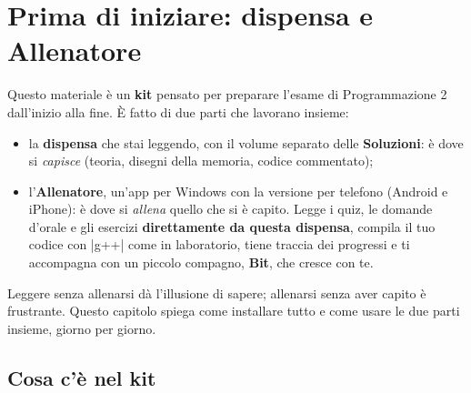 \chapter*{Prima di iniziare: dispensa e Allenatore}

Questo materiale è un \textbf{kit} pensato per preparare l'esame di Programmazione 2
dall'inizio alla fine. È fatto di due parti che lavorano insieme:
\begin{itemize}
  \item la \textbf{dispensa} che stai leggendo, con il volume separato delle
        \textbf{Soluzioni}: è dove si \emph{capisce} (teoria, disegni della memoria,
        codice commentato);
  \item l'\textbf{Allenatore}, un'app per Windows con la versione per telefono (Android e
        iPhone): è dove si \emph{allena} quello che si è capito. Legge i quiz, le
        domande d'orale e gli esercizi \textbf{direttamente da questa dispensa}, compila il
        tuo codice con \cc|g++| come in laboratorio, tiene traccia dei progressi e ti
        accompagna con un piccolo compagno, \textbf{Bit}, che cresce con te.
\end{itemize}
Leggere senza allenarsi dà l'illusione di sapere; allenarsi senza aver capito è
frustrante. Questo capitolo spiega come installare tutto e come usare le due parti
insieme, giorno per giorno.

\section*{Cosa c'è nel kit}

